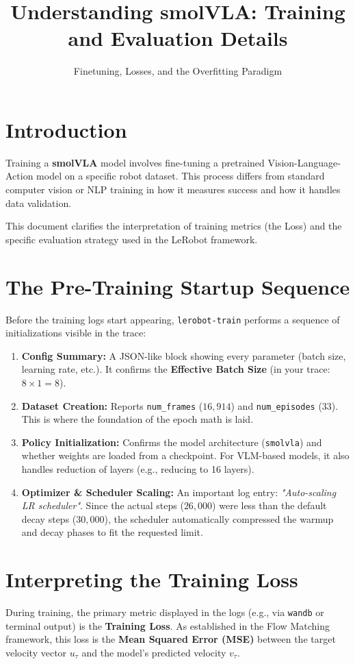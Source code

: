 \documentclass[11pt,a4paper]{article}
\title{\textbf{Understanding smolVLA: Training and Evaluation Details}}
\author{Finetuning, Losses, and the Overfitting Paradigm}
\date{\vspace{-5ex}}
\begin{document}
\maketitle

\section{Introduction}
Training a \textbf{smolVLA} model involves fine-tuning a pretrained Vision-Language-Action model on a specific robot dataset. This process differs from standard computer vision or NLP training in how it measures success and how it handles data validation. 

This document clarifies the interpretation of training metrics (the Loss) and the specific evaluation strategy used in the LeRobot framework.

\section{The Pre-Training Startup Sequence}
Before the training logs start appearing, \texttt{lerobot-train} performs a sequence of initializations visible in the trace:

\begin{enumerate}
    \item \textbf{Config Summary:} A JSON-like block showing every parameter (batch size, learning rate, etc.). It confirms the \textbf{Effective Batch Size} (in your trace: $8 \times 1 = 8$).
    \item \textbf{Dataset Creation:} Reports \texttt{num\_frames} ($16,914$) and \texttt{num\_episodes} ($33$). This is where the foundation of the epoch math is laid.
    \item \textbf{Policy Initialization:} Confirms the model architecture (\texttt{smolvla}) and whether weights are loaded from a checkpoint. For VLM-based models, it also handles reduction of layers (e.g., reducing to 16 layers).
    \item \textbf{Optimizer \& Scheduler Scaling:} An important log entry: \textit{"Auto-scaling LR scheduler"}. Since the actual steps ($26,000$) were less than the default decay steps ($30,000$), the scheduler automatically compressed the warmup and decay phases to fit the requested limit.
\end{enumerate}

\section{Interpreting the Training Loss}
During training, the primary metric displayed in the logs (e.g., via \texttt{wandb} or terminal output) is the \textbf{Training Loss}. As established in the Flow Matching framework, this loss is the \textbf{Mean Squared Error (MSE)} between the target velocity vector $u_\tau$ and the model's predicted velocity $v_\tau$.
\end{document}
